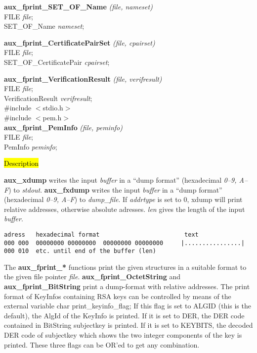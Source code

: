{\bf aux\_fprint\_SET\_OF\_Name} {\em (file, nameset)} \\
FILE {\em *file}; \\
SET\_OF\_Name {\em *nameset};

{\bf aux\_fprint\_CertificatePairSet} {\em (file, cpairset)} \\
FILE {\em *file}; \\
SET\_OF\_CertificatePair {\em *cpairset};

{\bf aux\_fprint\_VerificationResult} {\em (file, verifresult)} \\
FILE {\em *file}; \\
VerificationResult {\em *verifresult};
\\ [1em]
\#include $<$stdio.h$>$ \\
\#include $<$pem.h$>$ \\ [1em]
{\bf aux\_fprint\_PemInfo} {\em (file, peminfo)} \\
FILE {\em *file}; \\
PemInfo {\em *peminfo};

\hl{Description}

{\bf aux\_xdump} writes the input {\em buffer} in a
``dump format'' (hexadecimal {\em 0--9, A--F}) to {\em stdout}.
{\bf aux\_fxdump} writes the input {\em buffer} in a
``dump format'' (hexadecimal {\em 0--9, A--F}) to {\em dump\_file}.
If {\em addrtype} is set to 0, xdump will print relative addresses,
otherwise absolute adresses.
{\em len} gives the length of the input {\em buffer}.

{\small
\begin{verbatim}
adress   hexadecimal format                        text
000 000  00000000 00000000  00000000 00000000     |................|
000 010  etc. until end of the buffer (len)
\end{verbatim}
}

The {\bf aux\_fprint\_*} functions print the given structures in a suitable
format to the given file pointer {\em file}. {\bf aux\_fprint\_OctetString}
and {\bf aux\_fprint\_BitString} print a dump-format with relative addresses. 
The print format of KeyInfos
containing RSA keys can be controlled by means of the external variable
\bc
{\small
char print\_keyinfo\_flag;
}
\ec
If this flag is set to ALGID (this is the default), the AlgId of the KeyInfo
is printed. If it is set to DER, the DER code contained in BitString subjectkey  
is printed. If it is set to KEYBITS, the decoded DER code of
subjectkey which shows the two integer components of the key is printed. These three
flags can be OR'ed to get any combination.

